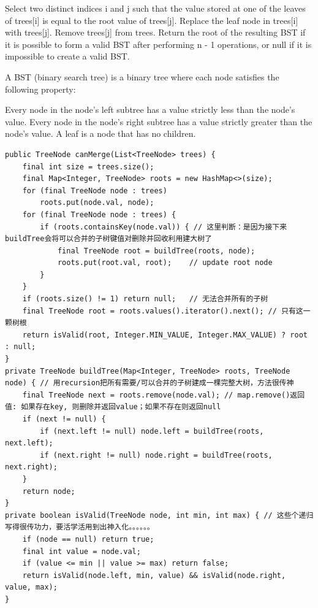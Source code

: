 \documentclass[9pt, b5paaper]{book}
\begin{document}
Select two distinct indices i and j such that the value stored at one of the leaves of trees[i] is equal to the root value of trees[j].
Replace the leaf node in trees[i] with trees[j].
Remove trees[j] from trees.
Return the root of the resulting BST if it is possible to form a valid BST after performing n - 1 operations, or null if it is impossible to create a valid BST.

A BST (binary search tree) is a binary tree where each node satisfies the following property:

Every node in the node's left subtree has a value strictly less than the node's value.
Every node in the node's right subtree has a value strictly greater than the node's value.
A leaf is a node that has no children.
\begin{verbatim}
public TreeNode canMerge(List<TreeNode> trees) {
    final int size = trees.size();
    final Map<Integer, TreeNode> roots = new HashMap<>(size);
    for (final TreeNode node : trees) 
        roots.put(node.val, node);
    for (final TreeNode node : trees) {
        if (roots.containsKey(node.val)) { // 这里判断：是因为接下来buildTree会将可以合并的子树键值对删除并回收利用建大树了
            final TreeNode root = buildTree(roots, node);
            roots.put(root.val, root);    // update root node
        }
    }
    if (roots.size() != 1) return null;   // 无法合并所有的子树
    final TreeNode root = roots.values().iterator().next(); // 只有这一颗树根
    return isValid(root, Integer.MIN_VALUE, Integer.MAX_VALUE) ? root : null;
}
private TreeNode buildTree(Map<Integer, TreeNode> roots, TreeNode node) { // 用recursion把所有需要/可以合并的子树建成一棵完整大树，方法很传神
    final TreeNode next = roots.remove(node.val); // map.remove()返回值: 如果存在key, 则删除并返回value；如果不存在则返回null
    if (next != null) {
        if (next.left != null) node.left = buildTree(roots, next.left);
        if (next.right != null) node.right = buildTree(roots, next.right);
    }
    return node;
}
private boolean isValid(TreeNode node, int min, int max) { // 这些个递归写得很传功力，要活学活用到出神入化。。。。。。
    if (node == null) return true;
    final int value = node.val;
    if (value <= min || value >= max) return false;
    return isValid(node.left, min, value) && isValid(node.right, value, max);
}
\end{verbatim}
\end{document}
